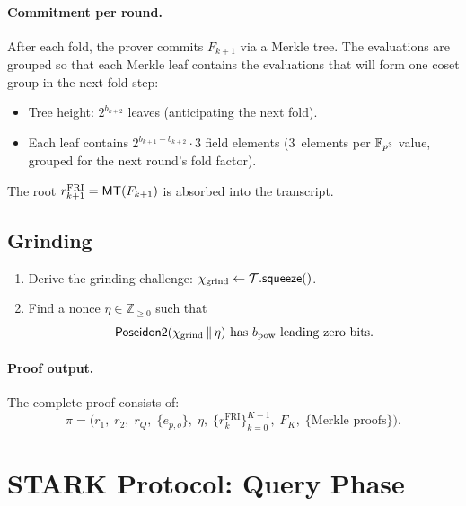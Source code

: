 \paragraph{Commitment per round.}
After each fold, the prover commits $F_{k+1}$ via a Merkle tree.
The evaluations are grouped so that each Merkle leaf contains
the evaluations that will form one coset group in the next fold step:

\begin{itemize}[nosep]
  \item Tree height: $2^{b_{k+2}}$ leaves (anticipating the next fold).
  \item Each leaf contains $2^{b_{k+1} - b_{k+2}} \cdot 3$ field elements
        ($3$~elements per $\mathbb{F}_{p^3}$ value, grouped for the next round's fold factor).
\end{itemize}

The root $r_{k+1}^{\mathrm{FRI}} = \textsf{MT}(F_{k+1})$ is absorbed into the transcript.

\subsection{Grinding}
\label{sec:pow}

\begin{enumerate}[label=(\roman*)]
  \item Derive the grinding challenge:
        $\chi_{\mathrm{grind}} \leftarrow \mathcal{T}.\textsf{squeeze}()$.

  \item Find a nonce $\eta \in \mathbb{Z}_{\geq 0}$ such that
        \[
          \textsf{Poseidon2}(\chi_{\mathrm{grind}} \,\|\, \eta)
          \text{ has } b_{\mathrm{pow}} \text{ leading zero bits}.
        \]
\end{enumerate}

\paragraph{Proof output.}
The complete proof consists of:
\[
  \pi = \bigl(
    r_1,\; r_2,\; r_Q,\;
    \{e_{p,o}\},\;
    \eta,\;
    \{r_k^{\mathrm{FRI}}\}_{k=0}^{K-1},\;
    F_K,\;
    \{\text{Merkle proofs}\}
  \bigr).
\]

\section{STARK Protocol: Query Phase}
\label{sec:query-phase}

